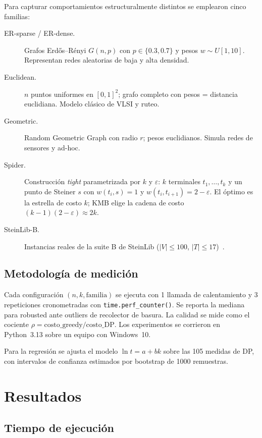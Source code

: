 \documentclass[11pt]{article}
\begin{document}
Para capturar comportamientos estructuralmente distintos se emplearon cinco
familias:

\begin{description}
  \item[ER-sparse / ER-dense.] Grafos Erd\H{o}s--R\'enyi $G(n,p)$ con
    $p\in\{0.3,0.7\}$ y pesos $w\sim U[1,10]$.  Representan redes aleatorias
    de baja y alta densidad.
  \item[Euclidean.] $n$ puntos uniformes en $[0,1]^2$; grafo completo con
    pesos = distancia euclidiana.  Modelo cl\'asico de VLSI y ruteo.
  \item[Geometric.] Random Geometric Graph con radio $r$; pesos euclidianos.
    Simula redes de sensores y ad-hoc.
  \item[Spider.] Construcci\'on \emph{tight} parametrizada por $k$ y
    $\varepsilon$: $k$ terminales $t_1,\ldots,t_k$ y un punto de Steiner $s$
    con $w(t_i,s)=1$ y $w(t_i,t_{i+1})=2-\varepsilon$.  El \'optimo es la
    estrella de costo $k$; KMB elige la cadena de costo
    $(k-1)(2-\varepsilon)\approx 2k$.
  \item[SteinLib-B.] Instancias reales de la suite B de SteinLib
    ($|V|\le 100$, $|T|\le 17$)~\cite{KochMartinVoss2001}.
\end{description}

\subsection{Metodolog\'ia de medici\'on}

Cada configuraci\'on $(n,k,\text{familia})$ se ejecuta con 1 llamada de
calentamiento y 3 repeticiones cronometradas con
\texttt{time.perf\_counter()}.  Se reporta la mediana para robusted ante
outliers de recolector de basura.  La calidad se mide como el cociente
$\rho = \mathrm{costo\_greedy}/\mathrm{costo\_DP}$.  Los experimentos
se corrieron en Python~3.13 sobre un equipo con Windows~10.

Para la regresi\'on se ajusta el modelo $\ln t = a + bk$ sobre las 105
medidas de DP, con intervalos de confianza estimados por bootstrap de
1000 remuestras.

\section{Resultados}\label{sec:results}

\subsection{Tiempo de ejecuci\'on}\label{sec:results-time}
\end{document}
